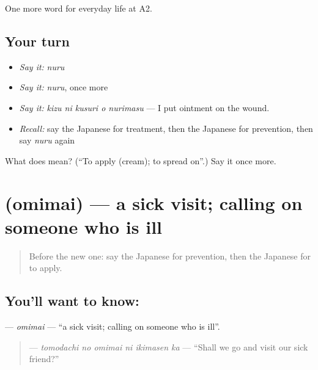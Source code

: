 \begin{grammarlens}[title={What you've built}]
One more word for everyday life at A2.
\end{grammarlens}

\subsection*{Your turn}
\begin{itemize}
\raggedright
  \item \emph{Say it:} \emph{nuru}
  \item \emph{Say it:} \emph{nuru}, once more
  \item \emph{Say it:} \emph{kizu ni kusuri o nurimasu} — I put ointment on the wound.
  \item \emph{Recall:} say the Japanese for treatment, then the Japanese for prevention, then say \emph{nuru} again
\end{itemize}

\begin{tcolorbox}[breakable,colback=teal!4,colframe=teal!35!black,title={Before you move on}]
What does  mean? (\textquotedblleft{}To apply (cream); to spread on\textquotedblright{}.) Say it once more.
\end{tcolorbox}
\section[\texorpdfstring{\ja{おみまい} (omimai)}{おみまい (omimai)}]{ (omimai) — a sick visit; calling on someone who is ill}

\label{lesson:JA-C222-omimai}



\begin{quote}
Before the new one: say the Japanese for prevention, then the Japanese for to apply.
\end{quote}

\subsection*{You'll want to know: }
\textbf{} — \emph{omimai} — \textquotedblleft{}a sick visit; calling on someone who is ill\textquotedblright{}.

\begin{quote}
\textbf{  } — \emph{tomodachi no omimai ni ikimasen ka} — \textquotedblleft{}Shall we go and visit our sick friend?\textquotedblright{}
\end{quote}

